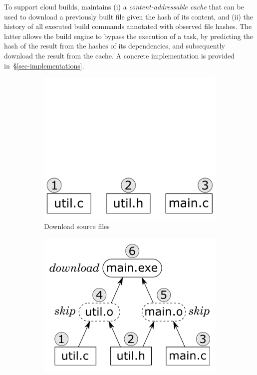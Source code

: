 To support cloud builds, \Bazel maintains (i) a \emph{content-addressable cache}
that can be used to download a previously built file given the hash of its
content, and (ii) the history of all executed build commands annotated with
observed file hashes. The latter allows the build engine to bypass the execution
of a task, by predicting the hash of the result from the hashes of its
dependencies, and subsequently download the result from the cache. A concrete
implementation is provided in~\S\ref{sec-implementations}.

\begin{figure}[t]
\begin{subfigure}[b]{0.25\linewidth}
\centerline{\includegraphics[scale=0.28]{fig/bazel-example-checkout.pdf}}
\caption{Download source files}
\end{subfigure}
\begin{subfigure}[b]{0.40\linewidth}
\centerline{\includegraphics[scale=0.28]{fig/bazel-example-build.pdf}}

\end{subfigure}
\end{figure}
